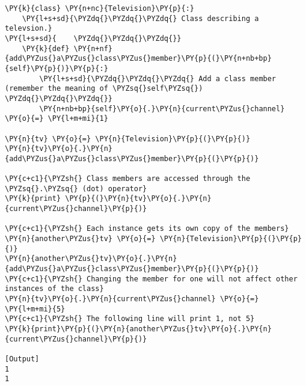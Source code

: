 \begin{Verbatim}[label=\makebox{\url{https://github.com/lucabaldini/cmepda/tree/master/slides/latex/snippets/class\_members.py}},commandchars=\\\{\}]
\PY{k}{class} \PY{n+nc}{Television}\PY{p}{:}
    \PY{l+s+sd}{\PYZdq{}\PYZdq{}\PYZdq{} Class describing a televsion.}
\PY{l+s+sd}{    \PYZdq{}\PYZdq{}\PYZdq{}}
    \PY{k}{def} \PY{n+nf}{add\PYZus{}a\PYZus{}class\PYZus{}member}\PY{p}{(}\PY{n+nb+bp}{self}\PY{p}{)}\PY{p}{:}
        \PY{l+s+sd}{\PYZdq{}\PYZdq{}\PYZdq{} Add a class member (remember the meaning of \PYZsq{}self\PYZsq{}) \PYZdq{}\PYZdq{}\PYZdq{}}
        \PY{n+nb+bp}{self}\PY{o}{.}\PY{n}{current\PYZus{}channel} \PY{o}{=} \PY{l+m+mi}{1}

\PY{n}{tv} \PY{o}{=} \PY{n}{Television}\PY{p}{(}\PY{p}{)}
\PY{n}{tv}\PY{o}{.}\PY{n}{add\PYZus{}a\PYZus{}class\PYZus{}member}\PY{p}{(}\PY{p}{)}

\PY{c+c1}{\PYZsh{} Class members are accessed through the \PYZsq{}.\PYZsq{} (dot) operator}
\PY{k}{print} \PY{p}{(}\PY{n}{tv}\PY{o}{.}\PY{n}{current\PYZus{}channel}\PY{p}{)}

\PY{c+c1}{\PYZsh{} Each instance gets its own copy of the members}
\PY{n}{another\PYZus{}tv} \PY{o}{=} \PY{n}{Television}\PY{p}{(}\PY{p}{)}
\PY{n}{another\PYZus{}tv}\PY{o}{.}\PY{n}{add\PYZus{}a\PYZus{}class\PYZus{}member}\PY{p}{(}\PY{p}{)}
\PY{c+c1}{\PYZsh{} Changing the member for one will not affect other instances of the class}
\PY{n}{tv}\PY{o}{.}\PY{n}{current\PYZus{}channel} \PY{o}{=} \PY{l+m+mi}{5}
\PY{c+c1}{\PYZsh{} The following line will print 1, not 5}
\PY{k}{print}\PY{p}{(}\PY{n}{another\PYZus{}tv}\PY{o}{.}\PY{n}{current\PYZus{}channel}\PY{p}{)}

[Output]
1
1
\end{Verbatim}
